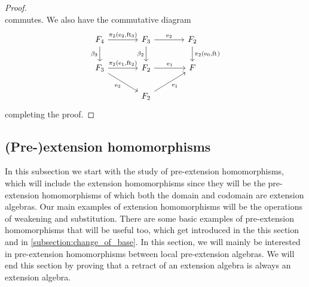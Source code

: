 \begin{proof}
\begin{equation*}
\end{equation*}
commutes. We also have the commutative diagram
\begin{equation*}
\begin{tikzcd}[column sep=large]
\stesysf_4
  \ar{r}{\pullbackpr{2}{\eext{2}}{\eft[3]}}
  \ar{d}[swap]{\beta_3}
  &
\stesysf_3
  \ar{r}{\eext{2}}
  \ar{d}[swap]{\beta_2}
  &
\stesysf_2
  \ar{d}{\pullbackpr{2}{\ectxext}{\eft}}
  \\
\stesysf_3
  \ar{r}{\pullbackpr{2}{\efamext}{\eft[2]}}
  \ar{dr}[swap]{\eext{2}}
  &
\stesysf_2
  \ar{r}{\efamext}
  &
\stesysf
  \\
  {} &
\stesysf_2
  \ar{ur}[swap]{\efamext}
\end{tikzcd}
\end{equation*}
completing the proof.
\end{proof}

\subsection{(Pre-)extension homomorphisms}\label{subsection:e_extension_homomorphisms}
In this subsection we start with the study of pre-extension homomorphisms, which
will include the extension homomorphisms since they will be the pre-extension
homomorphisms of which both the domain and codomain are extension algebras.
Our main examples of extension homomorphisms will be the operations of weakening
and substitution. There are some basic examples of pre-extension homomorphisms
that will be useful too, which get introduced in the this section and in
\autoref{subsection:change_of_base}. In this section, we will mainly be
interested in pre-extension homomorphisms between local pre-extension algebras.
We will end this section by proving that a retract of an extension algebra is
always an extension algebra.

